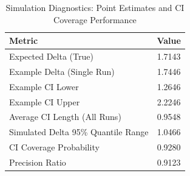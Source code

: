 \begin{table}
\caption{Simulation Diagnostics: Point Estimates and CI Coverage Performance}
\label{tab:mea_sim_results}
\begin{tabular}{lc}
\toprule
Metric & Value \\
\midrule
Expected Delta (True) & 1.7143 \\
Example Delta (Single Run) & 1.7446 \\
Example CI Lower & 1.2646 \\
Example CI Upper & 2.2246 \\
Average CI Length (All Runs) & 0.9548 \\
Simulated Delta 95\% Quantile Range & 1.0466 \\
CI Coverage Probability & 0.9280 \\
Precision Ratio & 0.9123 \\
\bottomrule
\end{tabular}
\end{table}
